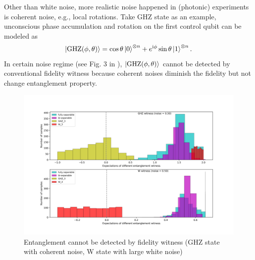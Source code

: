 \documentclass[
aps,
pra,
twocolumn,
floatfix,
]{revtex4-2}
\theoremstyle{plain}
\theoremstyle{definition}
\newcommand{\ghz}{\text{GHZ}}
\begin{document}
Other than white noise, more realistic noise happened in (photonic) experiments is coherent noise, e.g., local rotations.
Take GHZ state as an example, unconscious phase accumulation and 
rotation on the first control qubit can be modeled as 
\cite{zhouEntanglementDetectionCoherent2020}
\begin{equation}
	\ket{\ghz(\phi,\theta)}=
	\cos\theta\ket{0}^{\otimes n}+e^{\ii \phi}\sin\theta\ket{1}^{\otimes n}.
	\label{eq:coherent_noise}
\end{equation}
In certain noise regime (see Fig. 3 in \cite{zhouEntanglementDetectionCoherent2020}), $\ket{\ghz(\phi,\theta)}$ cannot be detected by conventional fidelity witness because coherent noises diminish the fidelity but not change entanglement property.
\begin{figure}[!ht]
	\centering
	\includegraphics[width=.9\linewidth]{./Code/fidelity_witness_compare_2_long.png}
	\caption{Entanglement cannot be detected by fidelity witness (GHZ state with coherent noise, W state with large white noise)}
\end{figure}
\end{document}
